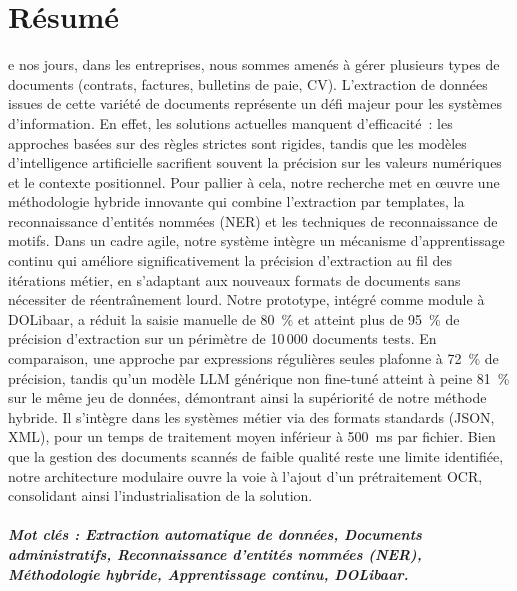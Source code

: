 %
%
%

\chapter*{R\'{e}sum\'{e}}
e nos jours, dans les entreprises, nous sommes amen\'{e}s \`{a} g\'{e}rer plusieurs types de documents (contrats, factures, bulletins de paie, CV). L'extraction de donn\'{e}es issues de cette vari\'{e}t\'{e} de documents repr\'{e}sente un d\'{e}fi majeur pour les syst\`{e}mes d'information. En effet, les solutions actuelles manquent d'efficacit\'{e}~: les approches bas\'{e}es sur des r\`{e}gles strictes sont rigides, tandis que les mod\`{e}les d'intelligence artificielle sacrifient souvent la pr\'{e}cision sur les valeurs num\'{e}riques et le contexte positionnel. Pour pallier \`{a} cela, notre recherche met en \oe{}uvre une m\'{e}thodologie hybride innovante qui combine l'extraction par templates, la reconnaissance d'entit\'{e}s nomm\'{e}es (NER) et les techniques de reconnaissance de motifs. Dans un cadre agile, notre syst\`{e}me int\`{e}gre un m\'{e}canisme d'apprentissage continu qui am\'{e}liore significativement la pr\'{e}cision d'extraction au fil des it\'{e}rations m\'{e}tier, en s'adaptant aux nouveaux formats de documents sans n\'{e}cessiter de r\'{e}entra\^{\i}nement lourd. Notre prototype, int\'{e}gr\'{e} comme module \`{a} DOLibaar, a r\'{e}duit la saisie manuelle de 80~\% et atteint plus de 95~\% de pr\'{e}cision d'extraction sur un p\'{e}rim\`{e}tre de 10\,000 documents tests. En comparaison, une approche par expressions r\'{e}guli\`{e}res seules plafonne \`{a} 72~\% de pr\'{e}cision, tandis qu'un mod\`{e}le LLM g\'{e}n\'{e}rique non fine-tun\'{e} atteint \`{a} peine 81~\% sur le m\^{e}me jeu de donn\'{e}es, d\'{e}montrant ainsi la sup\'{e}riorit\'{e} de notre m\'{e}thode hybride. Il s'int\`{e}gre dans les syst\`{e}mes m\'{e}tier via des formats standards (JSON, XML), pour un temps de traitement moyen inf\'{e}rieur \`{a} 500~ms par fichier. Bien que la gestion des documents scann\'{e}s de faible qualit\'{e} reste une limite identifi\'{e}e, notre architecture modulaire ouvre la voie \`{a} l'ajout d'un pr\'{e}traitement OCR, consolidant ainsi l'industrialisation de la solution.

\paragraph{Mot cl\'{e}s : Extraction automatique de donn\'{e}es, Documents administratifs, Reconnaissance d'entit\'{e}s nomm\'{e}es (NER), M\'{e}thodologie hybride, Apprentissage continu, DOLibaar.}


\clearpage

